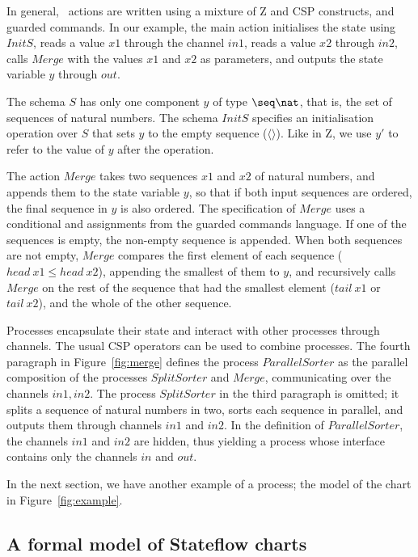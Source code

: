 \documentclass[submission]{eptcs}
\begin{document}
In general, \Circus\ actions are written using a mixture of Z and CSP constructs, and guarded commands. In our example, the main action initialises the state using $InitS$, reads a value $x1$ through the channel $in1$, reads a value $x2$ through $in2$, calls $Merge$ with the values $x1$ and $x2$ as parameters, and outputs the state variable $y$ through $out$.

The schema $S$ has only one component $y$ of type $\seq \nat$, that is, the set of sequences of natural numbers. The schema $InitS$ specifies an initialisation operation over $S$ that sets $y$ to the empty sequence ($\langle \rangle$). Like in Z, we use $y'$ to refer to the value of $y$ after the operation.

The action $Merge$ takes two sequences $x1$ and $x2$ of natural numbers, and appends them to the state variable $y$, so that if both input sequences are ordered, the final sequence in $y$ is also ordered. The specification of $Merge$ uses a conditional and assignments from the guarded commands language. If one of the sequences is empty, the non-empty sequence is appended. When both sequences are not empty, $Merge$ compares the first element of each sequence ($head~x1 \leq head~x2$), appending the smallest of them to $y$, and recursively calls $Merge$ on the rest of the sequence that had the smallest element ($tail~x1$ or $tail~x2$), and the whole of the other sequence.

Processes encapsulate their state and interact with other processes through channels. The usual CSP operators can be used to combine processes. The fourth paragraph in Figure~\ref{fig:merge} defines the process $ParallelSorter$ as the parallel composition of the processes $SplitSorter$ and $Merge$, communicating over the channels $in1, in2$. The process $SplitSorter$ in the third paragraph is omitted; it splits a sequence of natural numbers in two, sorts each sequence in parallel, and outputs them through channels $in1$ and $in2$. In the definition of $ParallelSorter$, the channels $in1$ and $in2$ are hidden, thus yielding a process whose interface contains only the channels $in$ and $out$.

In the next section, we have another example of a process; the model of the chart in Figure~\ref{fig:example}.

\subsection{A formal model of Stateflow charts}
\label{sec:formal-model}
\end{document}
